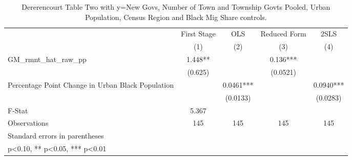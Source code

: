 \begin{table}[htbp]\centering
\def\sym#1{\ifmmode^{#1}\else\(^{#1}\)\fi}
\caption{Dererencourt Table Two with y=New Govs, Number of Town and Township Govts Pooled, Urban Population, Census Region and Black Mig Share controls.}
\begin{tabular}{l*{4}{c}}
\toprule
                    & First Stage   &         OLS   &Reduced Form   &        2SLS   \\
                    &\multicolumn{1}{c}{(1)}   &\multicolumn{1}{c}{(2)}   &\multicolumn{1}{c}{(3)}   &\multicolumn{1}{c}{(4)}   \\
\midrule
GM\_rmnt\_hat\_raw\_pp  &       1.448** &               &       0.136***&               \\
                    &     (0.625)   &               &    (0.0521)   &               \\
\addlinespace
Percentage Point Change in Urban Black Population&               &      0.0461***&               &      0.0940***\\
                    &               &    (0.0133)   &               &    (0.0283)   \\
\midrule
F-Stat              &       5.367   &               &               &               \\
Observations        &         145   &         145   &         145   &         145   \\
\bottomrule
\multicolumn{5}{l}{\footnotesize Standard errors in parentheses}\\
\multicolumn{5}{l}{\footnotesize * p<0.10, ** p<0.05, *** p<0.01}\\
\end{tabular}
\end{table}
